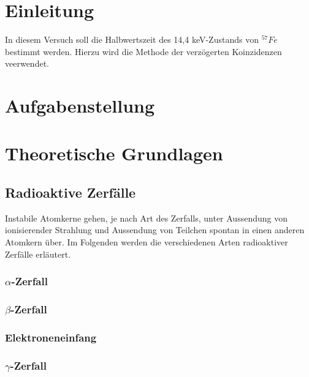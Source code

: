 \documentclass[12pt]{article}
\title{\vspace{0cm}{\Huge Fortgeschrittenen-Praktikum I:\\ \vspace{1cm} Kurze Halbwertszeiten}}
\author{Saskia Bondza\\Simon Stephan}
\date{Durchgeführt am 02.09.2016 und 05.09.2016}
\begin{document}
\maketitle
\newpage

\thispagestyle{empty}
\tableofcontents
\newpage

\section{Einleitung}
In diesem Versuch soll die Halbwertszeit des 14,4 keV-Zustands von $ ^{57}Fe$ bestimmt werden. Hierzu wird die Methode der verzögerten Koinzidenzen veerwendet.

\newpage
\section[Aufgabenstellung]{Aufgabenstellung}%



\newpage
\section{Theoretische Grundlagen}
\subsection{Radioaktive Zerfälle}
Instabile Atomkerne gehen, je nach Art des Zerfalls, unter Aussendung von ionisierender Strahlung und Aussendung von Teilchen spontan in einen anderen Atomkern über. Im Folgenden werden die verschiedenen Arten radioaktiver Zerfälle erläutert.
\subsubsection{$\alpha$-Zerfall}
\subsubsection{$\beta$-Zerfall}
\subsubsection{Elektroneneinfang}
\subsubsection{$\gamma$-Zerfall}
\end{document}
